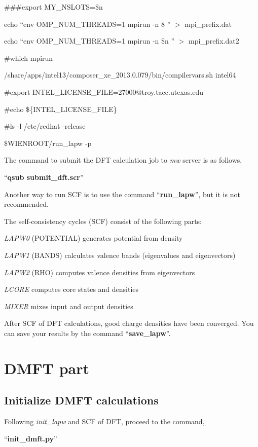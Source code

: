 \documentclass[12 pt]{article}
\begin{document}
{  \#\#\#export MY\_NSLOTS=\$n

  echo ``env OMP\_NUM\_THREADS=1 mpirun -n 8 '' $>$ mpi\_prefix.dat

  echo ``env OMP\_NUM\_THREADS=1 mpirun -n \$n '' $>$ mpi\_prefix.dat2

  \#which mpirun

  /share/apps/intel13/composer\_xe\_2013.0.079/bin/compilervars.sh intel64

  \#export INTEL\_LICENSE\_FILE=27000@troy.tacc.utexas.edu

  \#echo \$\{INTEL\_LICENSE\_FILE\}

  \#ls -l /etc/redhat -release

  \$WIENROOT/run\_lapw -p
}

  The command to submit the DFT calculation job to \emph{mw} server is as follows,

  ``\textbf{qsub submit\_dft.scr}''
 
  Another way to run SCF is to use the command ``\textbf{run\_lapw}'', but it is not recommended.

  The self-consistency cycles (SCF) consist of the following parts:

  \emph{LAPW0} (POTENTIAL) generates potential from density

  \emph{LAPW1} (BANDS) calculates valence bands (eigenvalues and eigenvectors)

  \emph{LAPW2} (RHO) computes valence densities from eigenvectors

  \emph{LCORE} computes core states and densities

  \emph{MIXER} mixes input and output densities

  After SCF of DFT calculations, good charge densities have been converged. You can save your results by the 
command ``\textbf{save\_lapw}''.   

  
  \cleardoublepage

    \section{DMFT part}

      \subsection{Initialize DMFT calculations}

  Following \emph{init\_lapw} and SCF of DFT, proceed to the command,

  ``\textbf{init\_dmft.py}''
\end{document}

